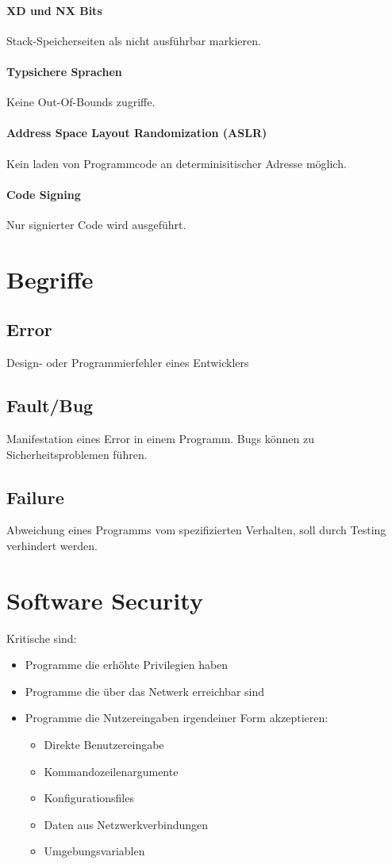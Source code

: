 \paragraph{XD und NX Bits}
Stack-Speicherseiten als nicht ausführbar markieren.

\paragraph{Typsichere Sprachen}
Keine Out-Of-Bounds zugriffe.

\paragraph{Address Space Layout Randomization (ASLR)}
Kein laden von Programmcode an determinisitischer Adresse möglich.

\paragraph{Code Signing}
Nur signierter Code wird ausgeführt.

\section{Begriffe}
\subsection{Error}
Design- oder Programmierfehler eines Entwicklers

\subsection{Fault/Bug}
Manifestation eines Error in einem Programm. Bugs können zu Sicherheitsproblemen führen.

\subsection{Failure}
Abweichung eines Programms vom spezifizierten Verhalten, soll durch Testing verhindert werden.

\section{Software Security}
Kritische sind:
\begin{itemize}
    \item Programme die erhöhte Privilegien haben
    \item Programme die über das Netwerk erreichbar sind
    \item Programme die Nutzereingaben irgendeiner Form akzeptieren:
        \begin{itemize}
            \item Direkte Benutzereingabe
            \item Kommandozeilenargumente
            \item Konfigurationsfiles
            \item Daten aus Netzwerkverbindungen
            \item Umgebungsvariablen
        \end{itemize}
\end{itemize}

